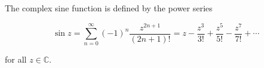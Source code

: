 The complex sine function is defined by the power series

$$\sin z = \sum_{n=0}^{\infty} (-1)^n \frac{z^{2n+1}}{(2n+1)!} = z - \frac{z^3}{3!} + \frac{z^5}{5!} - \frac{z^7}{7!} + \cdots$$

for all $z \in \mathbb{C}$.
